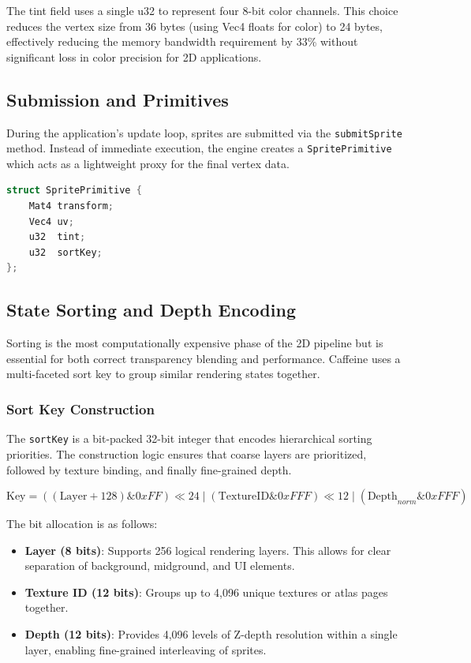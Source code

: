The tint field uses a single u32 to represent four 8-bit color channels. This choice reduces the vertex size from 36 bytes (using Vec4 floats for color) to 24 bytes, effectively reducing the memory bandwidth requirement by 33\% without significant loss in color precision for 2D applications.



\subsection{Submission and Primitives}

During the application's update loop, sprites are submitted via the \texttt{submitSprite} method. Instead of immediate execution, the engine creates a \texttt{SpritePrimitive} which acts as a lightweight proxy for the final vertex data.

\begin{lstlisting}[style=code, language=C++, caption={Internal SpritePrimitive Representation}]
struct SpritePrimitive {
    Mat4 transform;
    Vec4 uv;
    u32  tint;
    u32  sortKey;
};
\end{lstlisting}

\subsection{State Sorting and Depth Encoding}

Sorting is the most computationally expensive phase of the 2D pipeline but is essential for both correct transparency blending and performance. Caffeine uses a multi-faceted sort key to group similar rendering states together.

\subsubsection{Sort Key Construction}

The \texttt{sortKey} is a bit-packed 32-bit integer that encodes hierarchical sorting priorities. The construction logic ensures that coarse layers are prioritized, followed by texture binding, and finally fine-grained depth.

\begin{equation}
\text{Key} = ((\text{Layer} + 128) \& 0xFF) \ll 24 \mid (\text{TextureID} \& 0xFFF) \ll 12 \mid (\text{Depth}_{norm} \& 0xFFF)
\end{equation}

The bit allocation is as follows:
\begin{itemize}
    \item \textbf{Layer (8 bits)}: Supports 256 logical rendering layers. This allows for clear separation of background, midground, and UI elements.
    \item \textbf{Texture ID (12 bits)}: Groups up to 4,096 unique textures or atlas pages together.
    \item \textbf{Depth (12 bits)}: Provides 4,096 levels of Z-depth resolution within a single layer, enabling fine-grained interleaving of sprites.
\end{itemize}

